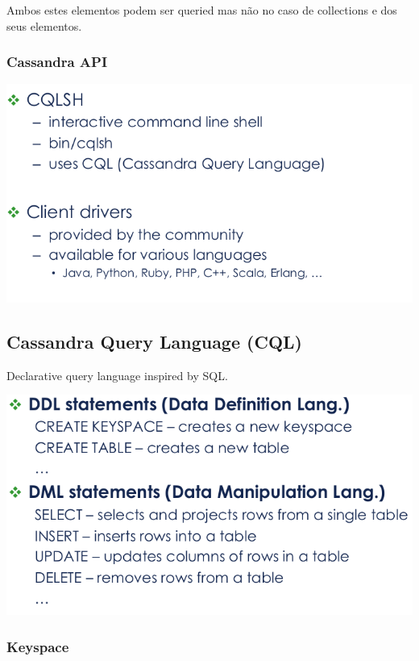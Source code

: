 \documentclass{article}
\begin{document}
Ambos estes elementos podem ser queried mas não no caso de collections e dos seus
elementos.

\pagebreak

\subsubsection{Cassandra API}

\begin{flushleft}
  \includegraphics[scale=0.3]{19}
\end{flushleft}

\subsection{Cassandra Query Language (CQL)}

Declarative query language inspired by SQL.

\begin{center}
  \includegraphics[scale=0.3]{20}
\end{center}

\subsubsection{Keyspace}
\end{document}
